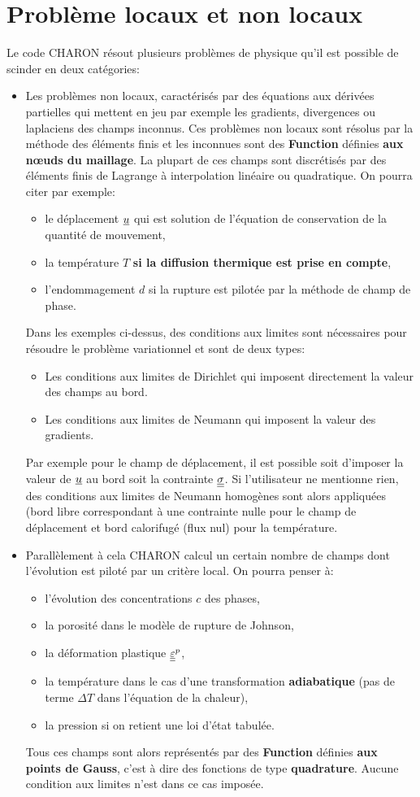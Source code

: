 \documentclass[10pt]{book}
\begin{document}
\section{Problème locaux et non locaux}
Le code CHARON résout plusieurs problèmes de physique qu'il est possible de scinder en deux catégories:
\begin{itemize}[label = $\star$]
\item Les problèmes non locaux, caractérisés par des équations aux dérivées partielles qui mettent en jeu par exemple les gradients, divergences ou laplaciens des champs inconnus. Ces problèmes non locaux sont résolus par la méthode des éléments finis et les inconnues sont des \textbf{Function} définies \textbf{aux nœuds du maillage}. La plupart de ces champs sont discrétisés par des éléments finis de Lagrange à interpolation linéaire ou quadratique. On pourra citer par exemple:
\begin{itemize}
\item le déplacement $\underline{u}$ qui est solution de l'équation de conservation de la quantité de mouvement, 
\item la température $T$ \textbf{si la diffusion thermique est prise en compte},
\item l'endommagement $d$ si la rupture est pilotée par la méthode de champ de phase.
\end{itemize}
Dans les exemples ci-dessus, des conditions aux limites sont nécessaires pour résoudre le problème variationnel et sont de deux types:
\begin{itemize}
\item Les conditions aux limites de Dirichlet qui imposent directement la valeur des champs au bord. 
\item Les conditions aux limites de Neumann qui imposent la valeur des gradients.
\end{itemize}
Par exemple pour le champ de déplacement, il est possible soit d'imposer la valeur de $\underline{u}$ au bord soit la contrainte $\underline{\underline{\sigma}}$. Si l'utilisateur ne mentionne rien, des conditions aux limites de Neumann homogènes sont alors appliquées (bord libre correspondant à une contrainte nulle pour le champ de déplacement et bord calorifugé (flux nul) pour la température.  
\item Parallèlement à cela CHARON calcul un certain nombre de champs dont l'évolution est piloté par un critère local. On pourra penser à:
\begin{itemize}
\item l'évolution des concentrations $c$ des phases, 
\item la porosité dans le modèle de rupture de Johnson, 
\item la déformation plastique $\underline{\underline{\varepsilon}}^{p}$,
\item la température dans le cas d'une transformation \textbf{adiabatique} (pas de terme $\Delta T$ dans l'équation de la chaleur),
\item la pression si on retient une loi d'état tabulée.
\end{itemize}
Tous ces champs sont alors représentés par des \textbf{Function} définies \textbf{aux points de Gauss}, c'est à dire des fonctions de type \textbf{quadrature}. Aucune condition aux limites n'est dans ce cas imposée.
\end{itemize}
\end{document}
